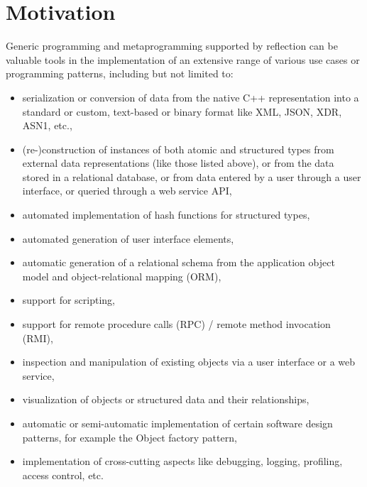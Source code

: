 \section{Motivation}

Generic programming and metaprogramming supported by reflection can be valuable
tools in the implementation of an extensive range of various use cases or
programming patterns, including but not limited to:

\begin{itemize}

\item serialization or conversion of data from the native C++ representation
into a standard or custom, text-based or binary format like XML, JSON, XDR, ASN1,
etc.,

\item (re-)construction of instances of both atomic and structured types
from external data representations (like those listed above), or
from the data stored in a relational database, or from data entered by
a user through a user interface, or queried through a web service API,

\item automated implementation of hash functions for structured types,

\item automated generation of user interface elements,

\item automatic generation of a relational schema from the application
object model and object-relational mapping (ORM),

\item support for scripting,

\item support for remote procedure calls (RPC) / remote method invocation (RMI),

\item inspection and manipulation of existing objects via a user interface
or a web service,

\item visualization of objects or structured data and their relationships,

\item automatic or semi-automatic implementation of certain software design
patterns, for example the Object factory pattern,

\item implementation of cross-cutting aspects like debugging, logging, profiling,
access control, etc.

\end{itemize}


